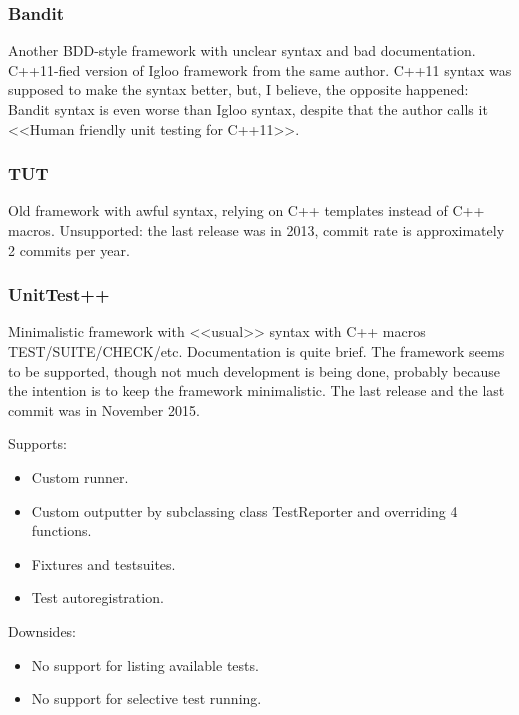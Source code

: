 \documentclass[10pt, a5paper]{article}
\begin{document}
\subsubsection*{Bandit}

Another BDD-style framework with unclear syntax and bad \linebreak documentation. C++11-fied version of Igloo framework from the same author. C++11 syntax was supposed to make the syntax better, but, I believe, the opposite happened: Bandit syntax is even worse than Igloo syntax, despite that the author calls it <<Human friendly unit testing for C++11>>.

\subsubsection*{TUT}

Old framework with awful syntax, relying on C++ templates instead of C++ macros. Unsupported: the last release was in 2013, commit rate is approximately 2 commits per year.

\subsubsection*{UnitTest++}

Minimalistic framework with <<usual>> syntax with C++ macros TEST/SUITE/CHECK/etc. Documentation is quite brief. \linebreak The framework seems to be supported, though not much development is being done, probably because the intention is to keep the framework minimalistic. The last release and the last commit was in November 2015.

Supports:

\begin{itemize}
  \item Custom runner.
  \item Custom outputter by subclassing class TestReporter and overriding 4 functions.
  \item Fixtures and testsuites.
  \item Test autoregistration.
\end{itemize}

Downsides:

\begin{itemize}
  \item No support for listing available tests.
  \item No support for selective test running.
\end{itemize}
\end{document}
